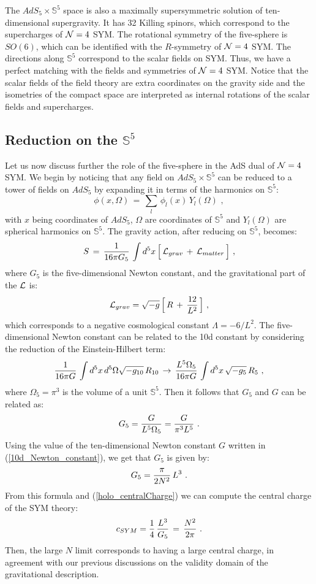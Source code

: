 \documentclass[12pt,notitlepage]{article}
\newcommand{\beq}{\begin{equation}}
\newcommand{\eeq}{\end{equation}}
\begin{document}
The $AdS_5\times {\mathbb S}^5$ space is also a maximally supersymmetric solution of ten-dimensional supergravity. It has 32 Killing spinors, which correspond to the supercharges of ${\cal N}=4$ SYM. The rotational symmetry of the five-sphere is $SO(6)$, which can be identified  with the $R$-symmetry of ${\cal N}=4$ SYM. The directions along ${\mathbb S}^5$ correspond to the scalar fields on SYM. Thus, we have a perfect matching with the fields and symmetries of ${\cal N}=4$ SYM. Notice that the scalar fields of the field theory are extra coordinates on the gravity side and the isometries of the compact space are interpreted as internal rotations of the scalar fields and supercharges. 
 

 
\subsection{Reduction on the ${\mathbb S}^5$}
\label{KK-reduction}

Let us now discuss further the role of the five-sphere in  the AdS dual of ${\cal N}=4$ SYM.  We begin by noticing that any field on $AdS_5\times {\mathbb S}^5$ can be reduced to a tower of fields on  $AdS_5$ by expanding  it in terms of the harmonics on ${\mathbb S}^5$:
\beq
\phi(x,\Omega)\,=\,\sum_{l}\,\phi_l (x)\,Y_l(\Omega)\,\,,
\label{KK_mode_expansion}
\eeq
with  $x$   being coordinates of  $AdS_5$, $\Omega$ are coordinates of  ${\mathbb S}^5$ and $Y_l(\Omega)$ are  spherical harmonics on ${\mathbb S}^5$. The gravity action, after reducing on  ${\mathbb S}^5$,  becomes:
\beq
S\,=\,{1\over 16\pi G_5}\,\int d^5 x\,\Big[\,{\cal L}_{grav}\,+\,{\cal L}_{matter}\,\Big]\,\,,
\eeq
where $G_5$ is the five-dimensional Newton constant, and the gravitational part of the ${\cal L}$ is:
\beq
{\cal L}_{grav}=\sqrt{-g}\,\Big[\,R\,+\,{12\over L^2}\,\Big]\,\,,
\eeq
which corresponds to a negative cosmological constant $\Lambda=-6/L^2$.
The five-dimensional Newton constant can be related to the 10d constant by considering the reduction of the Einstein-Hilbert term:
\beq
{1\over 16\pi G}\,\int d^5 x \,d^5\Omega \sqrt{-g_{10}}\,R_{10}\,\to\,
{L^5\Omega_5\over 16\pi G}\,\int d^5 x \, \sqrt{-g_{5}}\,R_{5}\,\,,
\eeq
where $\Omega_5=\pi^3$ is the volume of a unit  ${\mathbb S}^5$. Then it follows that  $G_5$ and $G$ can be related as:
\beq
G_5={G\over L^5\Omega_5}={G\over \pi^3 L^5}\,\,.
\eeq
Using the value of the ten-dimensional Newton constant $G$ written in (\ref{10d_Newton_constant}), we get that $G_5$ is given by:
\beq
G_5={\pi\over 2N^2}\,L^3\,\,.
\eeq
From this formula  and (\ref{holo_centralCharge}) we can compute the central charge of the SYM theory:
\beq
c_{SYM}={1\over 4}\,{L^3\over G_5}
\,=\,{N^2\over 2\pi}\,\,.
\eeq
Then, the large $N$ limit corresponds to having a large central charge, in agreement with our previous discussions on the validity domain of the gravitational description. 
\end{document}
